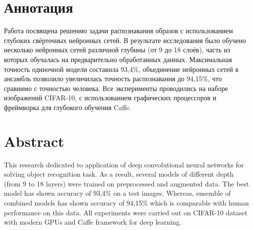 \section*{Аннотация}
Работа посвящена решению задачи распознавания образов с использованием глубоких свёрточных 
нейронных сетей. В результате исследования было обучено несколько нейронных сетей различной глубины 
(от 9 до 18 слоёв), часть из которых обучалась на предварительно обработанных данных. Максимальная 
точность одиночной модели составила 93,4\%, объединение нейронных сетей в ансамбль позволило
увеличилась точность распознавания до 94,15\%, что сравнимо с точностью человека. Все эксперименты 
проводились на наборе изображений CIFAR-10, с использованием графических процессоров и фреймворка
для глубокого обучения Caffe.

\section*{Abstract}
This research dedicated to application of deep convolutional neural networks for
solving object recognition task. As a result, several models of different depth (from 9 to 18 layers)
were trained on preprocessed and augmented data. The best model has shown accuracy of 93,4\% on a test images.
Whereas, ensemble of combined models has shown accuracy of 94,15\% which is comparable with human performance
on this data. All experiments were carried out on CIFAR-10 dataset with modern GPUs and Caffe framework for deep learning.
